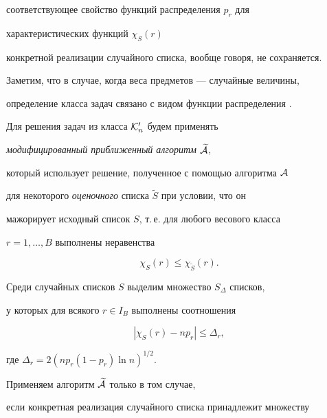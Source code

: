 соответствующее свойство функций распределения $p_{r}$ для


характеристических функций $\chi_S(r)$


конкретной реализации случайного списка, вообще говоря, не сохраняется.





Заметим, что в случае, когда веса предметов --- случайные величины,


определение класса задач связано с видом функции распределения .





Для решения задач из класса ${\cal K}_n'$ будем применять


{\em модифицированный приближенный алгоритм} $\widetilde {\cal A}$,


который использует решение, полученное с помощью  алгоритма ${\cal A}$


для некоторого {\em оценочного} списка $\widetilde S$ при условии, что он


мажорирует исходный список $S$, т.\,е. для любого весового класса


$r=1,\dotsc ,B$ выполнены неравенства


\begin{equation}


\label{e7}


\chi_S(r) \le  \chi_{\widetilde S}(r).


\end{equation}





Среди случайных списков $S$ выделим множество $S_{\Delta }$ списков,


у которых для всякого $r \in I_{B}$ выполнены соотношения


\begin{equation}


\label{e8}


|\chi_S(r)-np_{r}|\le \Delta_{r},


\end {equation}


где $\Delta_{r}=2(np_{r}(1-p_{r}) \ln n)^{1/2}$.





Применяем алгоритм $\widetilde {\cal A}$ только в том случае,


если конкретная реализация случайного списка принадлежит множеству


